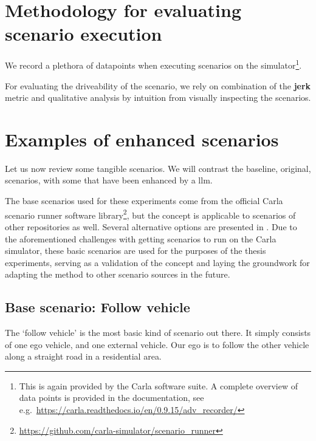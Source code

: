 \section{Methodology for evaluating scenario execution}

We record a plethora of datapoints when executing scenarios on the simulator\footnote{This is again
    provided by the Carla software suite. A complete overview of data points is provided in the
    documentation, see e.g.~\url{https://carla.readthedocs.io/en/0.9.15/adv_recorder/}}.

For evaluating the driveability of the scenario, we rely on combination of the \textbf{jerk} metric
and qualitative analysis by intuition from visually inspecting the scenarios.

\section{Examples of enhanced scenarios}\label{sec:examplesOfEnhancedScenarios}

Let us now review some tangible scenarios. We will contrast the baseline, original, scenarios, with
some that have been enhanced by a \acrshort{llm}.

The base scenarios used for these experiments come from the official Carla scenario runner software
library\footnote{\url{https://github.com/carla-simulator/scenario_runner}}, but the concept is
applicable to scenarios of other repositories as well. Several alternative options are presented in
. Due to the aforementioned challenges with getting scenarios to run on the
Carla simulator, these basic scenarios are used for the purposes of the thesis experiments, serving
as a validation of the concept and laying the groundwork for adapting the method to other scenario
sources in the future.

\subsection{Base scenario: Follow vehicle}\label{sec:followVehicleResults}

The `follow vehicle' is the most basic kind of scenario out there. It simply consists of one ego
vehicle, and one external vehicle. Our ego is to follow the other vehicle along a straight road in a
residential area.

